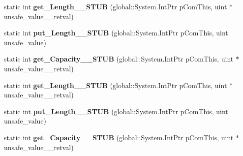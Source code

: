 \begin{DoxyCompactItemize}
\mbox{\label{struct_windows_1_1_storage_1_1_streams_1_1_i_buffer_____impl_1_1_vtbl_abddf84bc05273d8c2287462bf3ba0ed9}} 
static int {\bfseries get\+\_\+\+Length\+\_\+\+\_\+\+S\+T\+UB} (global\+::\+System.\+Int\+Ptr p\+Com\+This, uint $\ast$unsafe\+\_\+value\+\_\+\+\_\+retval)
\item 
\mbox{\label{struct_windows_1_1_storage_1_1_streams_1_1_i_buffer_____impl_1_1_vtbl_a80544026998fc1559ccd7885d251ce1b}} 
static int {\bfseries put\+\_\+\+Length\+\_\+\+\_\+\+S\+T\+UB} (global\+::\+System.\+Int\+Ptr p\+Com\+This, uint unsafe\+\_\+value)
\item 
\mbox{\label{struct_windows_1_1_storage_1_1_streams_1_1_i_buffer_____impl_1_1_vtbl_a0edf8e49726df558522286d08c40d999}} 
static int {\bfseries get\+\_\+\+Capacity\+\_\+\+\_\+\+S\+T\+UB} (global\+::\+System.\+Int\+Ptr p\+Com\+This, uint $\ast$unsafe\+\_\+value\+\_\+\+\_\+retval)
\item 
\mbox{\label{struct_windows_1_1_storage_1_1_streams_1_1_i_buffer_____impl_1_1_vtbl_abddf84bc05273d8c2287462bf3ba0ed9}} 
static int {\bfseries get\+\_\+\+Length\+\_\+\+\_\+\+S\+T\+UB} (global\+::\+System.\+Int\+Ptr p\+Com\+This, uint $\ast$unsafe\+\_\+value\+\_\+\+\_\+retval)
\item 
\mbox{\label{struct_windows_1_1_storage_1_1_streams_1_1_i_buffer_____impl_1_1_vtbl_a80544026998fc1559ccd7885d251ce1b}} 
static int {\bfseries put\+\_\+\+Length\+\_\+\+\_\+\+S\+T\+UB} (global\+::\+System.\+Int\+Ptr p\+Com\+This, uint unsafe\+\_\+value)
\item 
\mbox{\label{struct_windows_1_1_storage_1_1_streams_1_1_i_buffer_____impl_1_1_vtbl_a0edf8e49726df558522286d08c40d999}} 
static int {\bfseries get\+\_\+\+Capacity\+\_\+\+\_\+\+S\+T\+UB} (global\+::\+System.\+Int\+Ptr p\+Com\+This, uint $\ast$unsafe\+\_\+value\+\_\+\+\_\+retval)
\item 
\mbox{\label{struct_windows_1_1_storage_1_1_streams_1_1_i_buffer_____impl_1_1_vtbl_abddf84bc05273d8c2287462bf3ba0ed9}} 

\end{DoxyCompactItemize}
